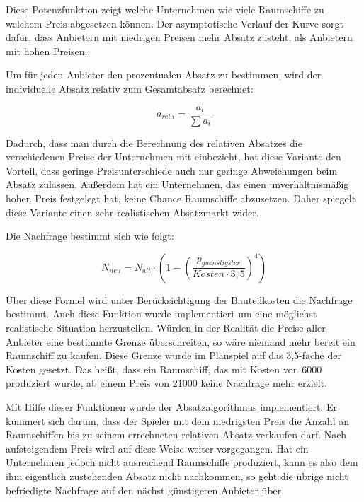 Diese Potenzfunktion zeigt welche Unternehmen wie viele Raumschiffe zu welchem Preis abgesetzen können. Der asymptotische
Verlauf der Kurve sorgt dafür, dass Anbietern mit niedrigen Preisen mehr Absatz zusteht, als Anbietern mit hohen Preisen.

Um für jeden Anbieter den prozentualen Absatz zu bestimmen, wird der individuelle Absatz relativ zum Gesamtabsatz berechnet:

\begin{equation}
     a_{rel. i} = \frac{a_i}{\sum a_i}
     \label{alg:spielwelt-logik-absatzmengen-2}
\end{equation}

Dadurch, dass man durch die Berechnung des relativen Absatzes die verschiedenen Preise der Unternehmen mit einbezieht, hat
diese Variante den Vorteil, dass geringe Preisunterschiede auch nur geringe Abweichungen beim Absatz zulassen. Außerdem hat
ein Unternehmen, das einen unverhältnismäßig hohen Preis festgelegt hat, keine Chance Raumschiffe abzusetzen. Daher spiegelt
diese Variante einen sehr realistischen Absatzmarkt wider.

Die Nachfrage bestimmt sich wie folgt:

\begin{equation}
     N_{neu} = N_{alt} \cdot (1 - (\frac{p_{guenstigster}}{Kosten \cdot 3,5})^4)
     \label{alg:spielwelt-logik-absatzmengen-3}
\end{equation}

Über diese Formel wird unter Berücksichtigung der Bauteilkosten die Nachfrage bestimmt. Auch diese Funktion wurde implementiert
um eine möglichst realistische Situation herzustellen. Würden in der Realität die Preise aller Anbieter eine bestimmte Grenze
überschreiten, so wäre niemand mehr bereit ein Raumschiff zu kaufen. Diese Grenze wurde im Planspiel auf das 3,5-fache der Kosten
gesetzt. Das heißt, dass ein Raumschiff, das mit Kosten von 6000\curr{} produziert wurde, ab einem Preis von 21000\curr{} keine
Nachfrage mehr erzielt.

Mit Hilfe dieser Funktionen wurde der Absatzalgorithmus implementiert. Er kümmert sich darum, dass der Spieler mit dem niedrigsten
Preis die Anzahl an Raumschiffen bis zu seinem errechneten relativen Absatz verkaufen darf. Nach aufsteigendem Preis wird auf
diese Weise weiter vorgegangen. Hat ein Unternehmen jedoch nicht ausreichend Raumschiffe produziert, kann es also dem ihm eigentlich
zustehenden Absatz nicht nachkommen, so geht die übrige nicht befriedigte Nachfrage auf den nächst günstigeren Anbieter über.

